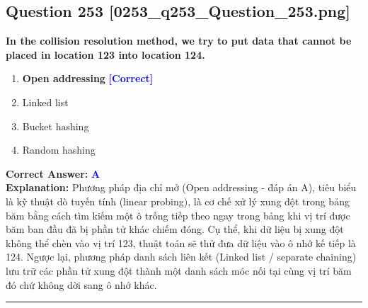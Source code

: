 \documentclass[11pt,a4paper]{article}
\begin{document}
\begin{minipage}{\textwidth}
\subsection*{Question 253 \quad \footnotesize{[0253\_q253\_Question\_253.png]}}
\noindent \textbf{In the collision resolution method, we try to put data that cannot be placed in location 123 into location 124.}

\begin{enumerate}[label=\Alph*.]
    \item \textbf{Open addressing} \hfill \textcolor{blue}{\textbf{[Correct]}}
    \item Linked list
    \item Bucket hashing
    \item Random hashing
\end{enumerate}

\noindent \textbf{Correct Answer:} \textcolor{blue}{\textbf{A}} \\[2pt]
\noindent \textbf{Explanation:} Phương pháp địa chỉ mở (Open addressing - đáp án A), tiêu biểu là kỹ thuật dò tuyến tính (linear probing), là cơ chế xử lý xung đột trong bảng băm bằng cách tìm kiếm một ô trống tiếp theo ngay trong bảng khi vị trí được băm ban đầu đã bị phần tử khác chiếm đóng. Cụ thể, khi dữ liệu bị xung đột không thể chèn vào vị trí 123, thuật toán sẽ thử đưa dữ liệu vào ô nhớ kế tiếp là 124. Ngược lại, phương pháp danh sách liên kết (Linked list / separate chaining) lưu trữ các phần tử xung đột thành một danh sách móc nối tại cùng vị trí băm đó chứ không dời sang ô nhớ khác.

\par\vspace{0.3cm}
\hrule
\vspace{0.3cm}
\end{minipage}
\end{document}
